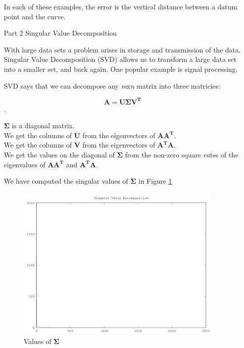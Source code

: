\documentclass[12pt,letterpaper]{article}
\begin{document}
\begin{enumerate}
      In each of these examples, the error is the vertical distance between a datum point and the curve.

    \pagebreak

    \item[Part 2] Singular Value Decomposition

      With large data sets a problem arises in storage and transmission of the data. Singular Value Decomposition (SVD) allows us to transform a large data set into a smaller set, and back again. One popular example is signal processing.

      SVD says that we can decompose any \textit{m}x\textit{n} matrix into three matricies:

      \[\mathbf{A} = \mathbf{U\Sigma V^T}\].

      $\mathbf{\Sigma}$ is a diagonal matrix. \\
      We get the columns of $\mathbf{U}$ from the eigenvectors of $\mathbf{AA^T}$. \\
      We get the columns of $\mathbf{V}$ from the eigenvectors of $\mathbf{A^TA}$. \\
      We get the values on the diagonal of $\mathbf{\Sigma}$ from the non-zero square rutes of the eigenvalues of $\mathbf{AA^T}$ and $\mathbf{A^TA}$.

      We have computed the singular values of $\mathbf{\Sigma}$ in Figure \ref{fig:svd_big}

      \begin{figure}[h]
        \centering
        \includegraphics[width=0.95\textwidth]{svd_big.jpg}
        \caption{Values of $\mathbf{\Sigma}$}
        \label{fig:svd_big}
      \end{figure}


\end{enumerate}
\end{document}
